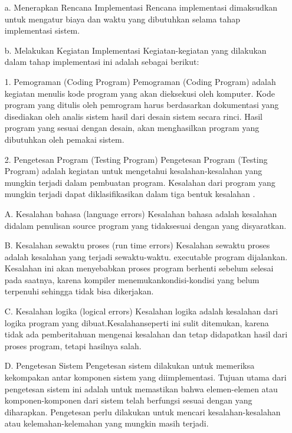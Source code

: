 \documentclass{jtetiproposalskripsi}
\begin{document}
\begin{itemize}
\item[a.]Menerapkan Rencana Implementasi
		 Rencana implementasi dimaksudkan untuk mengatur biaya dan waktu yang dibutuhkan selama tahap 			  	 implementasi sistem. 
\item[b.]Melakukan Kegiatan Implementasi
		 Kegiatan-kegiatan yang dilakukan dalam tahap implementasi ini adalah sebagai berikut:
\item[1.]Pemograman (Coding Program)
		 Pemograman (Coding Program) adalah kegiatan menulis kode program yang akan dieksekusi oleh 				komputer. Kode program yang ditulis oleh pemrogram harus berdasarkan dokumentasi yang disediakan oleh analis sistem hasil dari desain sistem secara rinci. Hasil program yang sesuai dengan desain, akan menghasilkan program yang dibutuhkan oleh pemakai sistem.
\item[2.] Pengetesan Program (Testing Program)
Pengetesan Program (Testing Program) adalah kegiatan untuk mengetahui kesalahan-kesalahan yang mungkin terjadi dalam pembuatan program. Kesalahan dari program yang mungkin terjadi dapat diklasifikasikan dalam tiga bentuk kesalahan .
\item[A.]Kesalahan bahasa (language errors)
		 Kesalahan bahasa adalah kesalahan didalam penulisan source program yang tidaksesuai dengan yang 			 disyaratkan.
\item[B.]Kesalahan sewaktu proses (run time errors)
		 Kesalahan sewaktu proses adalah kesalahan yang terjadi sewaktu-waktu. executable program 					 dijalankan. Kesalahan ini akan menyebabkan proses program berhenti sebelum selesai pada saatnya, 		     karena kompiler menemukankondisi-kondisi yang belum terpenuhi sehingga tidak bisa dikerjakan.
\item[C.]Kesalahan logika (logical errors)
		 Kesalahan logika adalah kesalahan dari logika program yang dibuat.Kesalahanseperti ini sulit 				 ditemukan, karena tidak ada pemberitahuan mengenai kesalahan dan tetap didapatkan hasil dari 					proses program, tetapi hasilnya salah.
\item[D.]Pengetesan Sistem
		 Pengetesan sistem dilakukan untuk memeriksa kekompakan antar komponen sistem yang diimplementasi. 		 Tujuan utama dari pengetesan sistem ini adalah untuk memastikan bahwa elemen-elemen atau 					 komponen-komponen dari sistem telah berfungsi sesuai dengan yang diharapkan. Pengetesan perlu 				 dilakukan untuk mencari kesalahan-kesalahan atau kelemahan-kelemahan yang mungkin masih terjadi.

\end{itemize}
\end{document}
